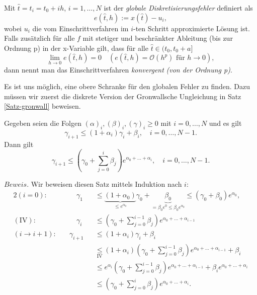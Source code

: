\begin{definition}
    Mit $\hat{t} = t_i = t_0+ih$, $i=1,\dots, N$ ist der {\em globale Diskretisierungsfehler} definiert als
    \[
        e(\hat{t}, h) := x(\hat{t}) - u_i,
    \]
    wobei $u_i$ die vom Einschrittverfahren im $i$-ten Schritt approximierte Lösung ist.\\
    Falls zusätzlich für alle $f$ mit stetiger und beschränkter Ableitung (bis zur Ordnung p) in der x-Variable gilt,
    dass für alle $\hat{t} \in (t_0, t_0+a]$
    \[
        \lim_{h \rightarrow 0 } e(\hat{t}, h)=0 \quad (e(\hat{t},h) = \mathcal{O}(h^p) \text{ für } h \rightarrow 0),
    \] dann nennt man das Einschrittverfahren {\em konvergent} {\em (von der Ordnung p)}.
\end{definition}
Es ist uns möglich, eine obere Schranke für den globalen Fehler zu finden. Dazu müssen wir zuerst die diskrete Version
der Gronwallsche Ungleichung in Satz \ref{Satz-gronwall} beweisen.
\begin{satz}
    Gegeben seien die Folgen \newline $(\alpha)_i,(\beta)_i,(\gamma)_i \geq 0$ mit $i = 0,\dots,N$ und es gilt
    \[
        \gamma_{i+1} \leq (1 + \alpha_i)\gamma_i + \beta_i, \quad i=0,\dots,N-1.
    \] Dann gilt
    \[
        \gamma_{i+1} \leq \left( \gamma_0 + \sum_{j=0}^{i}\beta_j \right) e^{\alpha_0 + \dots + \alpha_i},  \quad
        i=0, \dots, N-1.
    \]
\end{satz}
$Beweis.$ Wir beweisen diesen Satz mittels Induktion nach $i$:
\begin{alignat*}{2}
    (i=0):& \qquad \gamma_1 &&\leq
    \underbrace{(1 + \alpha_0)}_{\leq e^{\alpha_0}}\gamma_0 +
    \underbrace{\beta_0}_{=\beta_0 e^{0} \leq \beta_0 e^{\alpha_0}} \leq (\gamma_0 + \beta_0)e^{\alpha_0},\\
    (\text{IV}):& \qquad
    \gamma_{i} &&\leq \left( \gamma_0 + \sum_{j=0}^{i-1}\beta_j \right) e^{\alpha_0 + \dots + \alpha_{i-1}} \\
    (i \rightarrow i+1):& \quad
    \gamma_{i+1} &&\leq (1 + \alpha_{i})\gamma_{i} + \beta_i\\
    & &&\underset{\text{IV}}{\leq} (1 + \alpha_i)
    \left( \gamma_0 + \sum_{j=0}^{i-1}\beta_j \right) e^{\alpha_0 + \dots + \alpha_{i-1}}+\beta_{i}\\
    &  &&\leq e^{\alpha_i} \left( \gamma_0 + \sum_{j=0}^{i-1}\beta_j \right) e^{\alpha_0 + \dots + \alpha_{i-1}}
    + \beta_i e^{\alpha_0 + \dots + \alpha_{i}}\\
    &  &&\leq \left( \gamma_0 +  \sum_{j=0}^{i}\beta_j \right) e^{\alpha_0 + \dots + \alpha_{i}}.
\end{alignat*}\qedwhite\\
